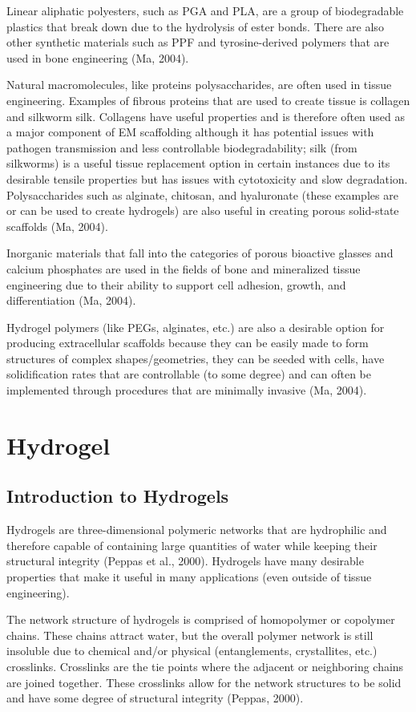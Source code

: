 Linear aliphatic polyesters, such as PGA and PLA, are a group of biodegradable plastics that break down due to the hydrolysis of ester bonds. There are also other synthetic materials such as PPF and tyrosine-derived polymers that are used in bone engineering (Ma, 2004).

Natural macromolecules, like proteins polysaccharides, are often used in tissue engineering. Examples of fibrous proteins that are used to create tissue is collagen and silkworm silk. Collagens have useful properties and is therefore often used as a major component of EM scaffolding although it has potential issues with pathogen transmission and less controllable biodegradability; silk (from silkworms) is a useful tissue replacement option in certain instances due to its desirable tensile properties but has issues with cytotoxicity and slow degradation. Polysaccharides such as alginate, chitosan, and hyaluronate (these examples are or can be used to create hydrogels) are also useful in creating porous solid-state scaffolds (Ma, 2004).

Inorganic materials that fall into the categories of porous bioactive glasses and calcium phosphates are used in the fields of bone and mineralized tissue engineering due to their ability to support cell adhesion, growth, and differentiation (Ma, 2004).

Hydrogel polymers (like PEGs, alginates, etc.) are also a desirable option for producing extracellular scaffolds because they can be easily made to form structures of complex shapes/geometries, they can be seeded with cells, have solidification rates that are controllable (to some degree) and can often be implemented through procedures that are minimally invasive (Ma, 2004).

\section{Hydrogel}

\subsection{Introduction to Hydrogels}
Hydrogels are three-dimensional polymeric networks that are hydrophilic and therefore capable of containing large quantities of water while keeping their structural integrity (Peppas et al., 2000). Hydrogels have many desirable properties that make it useful in many applications (even outside of tissue engineering).

The network structure of hydrogels is comprised of homopolymer or copolymer chains. These chains attract water, but the overall polymer network is still insoluble due to chemical and/or physical (entanglements, crystallites, etc.) crosslinks. Crosslinks are the tie points where the adjacent or neighboring chains are joined together. These crosslinks allow for the network structures to be solid and have some degree of structural integrity (Peppas, 2000).

